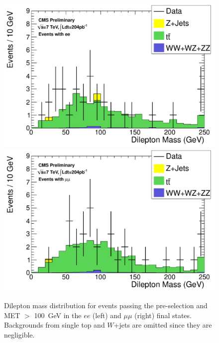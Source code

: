 \begin{figure}[hbt]
\begin{center}
\includegraphics[width=0.48\linewidth]{plots/hdilmass_pfmet100_ee_allj.pdf}
\includegraphics[width=0.48\linewidth]{plots/hdilmass_pfmet100_mm_allj.pdf}
\caption{\label{fig:dilmass60}\protect Dilepton mass distribution for events passing the pre-selection 
  and MET $>$ 100~GeV in the $ee$ (left) and $\mu\mu$ (right) final states. 
Backgrounds from single top and $W$+jets are omitted since they are negligible.}
\end{center}
\end{figure}
